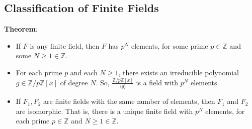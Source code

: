 \documentclass{article}
\begin{document}
\begin{multicols*}{2}
\section{Classification of Finite Fields}

\textbf{Theorem}:

\begin{itemize}
    \item If $F$ is any finite field, then $F$ has $p^N$ elements, for some prime $p \in \mathbb{Z}$ and some $N \geq 1 \in \mathbb{Z}$.
    \item For each prime $p$ and each $N \geq 1$, there exists an irreducible polynomial $g \in \mathbb{Z}/p\mathbb{Z}[x]$ of degree $N$. So, $\frac{\mathbb{Z}/p\mathbb{Z}[x]}{\langle g \rangle}$ is a field with $p^N$ elements.
    \item If $F_1, F_2$ are finite fields with the same number of elements, then $F_1$ and $F_2$ are isomorphic. That is, there is a unique finite field with $p^N$ elements, for each prime $p \in \mathbb{Z}$ and $N \geq 1 \in \mathbb{Z}$.
\end{itemize}

\end{multicols*}
\end{document}
